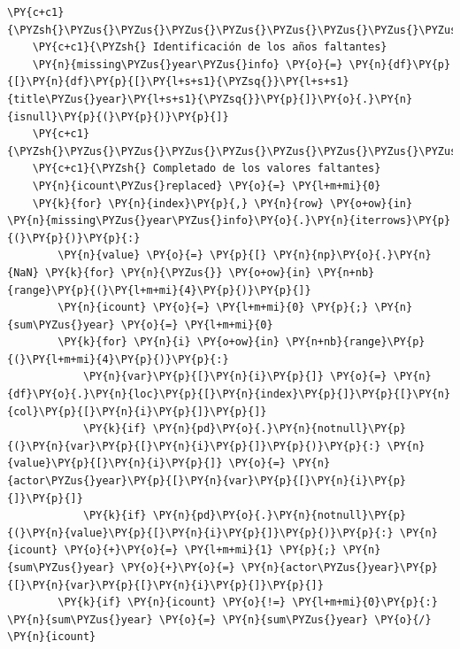 \begin{tcolorbox}[breakable, size=fbox, boxrule=1pt, pad at break*=1mm,colback=cellbackground, colframe=cellborder]
\begin{Verbatim}[commandchars=\\\{\}]
    \PY{c+c1}{\PYZsh{}\PYZus{}\PYZus{}\PYZus{}\PYZus{}\PYZus{}\PYZus{}\PYZus{}\PYZus{}\PYZus{}\PYZus{}\PYZus{}\PYZus{}\PYZus{}\PYZus{}\PYZus{}\PYZus{}\PYZus{}\PYZus{}\PYZus{}\PYZus{}\PYZus{}\PYZus{}\PYZus{}\PYZus{}\PYZus{}\PYZus{}\PYZus{}\PYZus{}\PYZus{}\PYZus{}\PYZus{}\PYZus{}\PYZus{}\PYZus{}\PYZus{}\PYZus{}\PYZus{}\PYZus{}}
    \PY{c+c1}{\PYZsh{} Identificación de los años faltantes}
    \PY{n}{missing\PYZus{}year\PYZus{}info} \PY{o}{=} \PY{n}{df}\PY{p}{[}\PY{n}{df}\PY{p}{[}\PY{l+s+s1}{\PYZsq{}}\PY{l+s+s1}{title\PYZus{}year}\PY{l+s+s1}{\PYZsq{}}\PY{p}{]}\PY{o}{.}\PY{n}{isnull}\PY{p}{(}\PY{p}{)}\PY{p}{]}
    \PY{c+c1}{\PYZsh{}\PYZus{}\PYZus{}\PYZus{}\PYZus{}\PYZus{}\PYZus{}\PYZus{}\PYZus{}\PYZus{}\PYZus{}\PYZus{}\PYZus{}\PYZus{}\PYZus{}\PYZus{}\PYZus{}\PYZus{}\PYZus{}\PYZus{}\PYZus{}\PYZus{}\PYZus{}\PYZus{}\PYZus{}\PYZus{}\PYZus{}\PYZus{}}
    \PY{c+c1}{\PYZsh{} Completado de los valores faltantes}
    \PY{n}{icount\PYZus{}replaced} \PY{o}{=} \PY{l+m+mi}{0}
    \PY{k}{for} \PY{n}{index}\PY{p}{,} \PY{n}{row} \PY{o+ow}{in} \PY{n}{missing\PYZus{}year\PYZus{}info}\PY{o}{.}\PY{n}{iterrows}\PY{p}{(}\PY{p}{)}\PY{p}{:}
        \PY{n}{value} \PY{o}{=} \PY{p}{[} \PY{n}{np}\PY{o}{.}\PY{n}{NaN} \PY{k}{for} \PY{n}{\PYZus{}} \PY{o+ow}{in} \PY{n+nb}{range}\PY{p}{(}\PY{l+m+mi}{4}\PY{p}{)}\PY{p}{]}
        \PY{n}{icount} \PY{o}{=} \PY{l+m+mi}{0} \PY{p}{;} \PY{n}{sum\PYZus{}year} \PY{o}{=} \PY{l+m+mi}{0}
        \PY{k}{for} \PY{n}{i} \PY{o+ow}{in} \PY{n+nb}{range}\PY{p}{(}\PY{l+m+mi}{4}\PY{p}{)}\PY{p}{:}            
            \PY{n}{var}\PY{p}{[}\PY{n}{i}\PY{p}{]} \PY{o}{=} \PY{n}{df}\PY{o}{.}\PY{n}{loc}\PY{p}{[}\PY{n}{index}\PY{p}{]}\PY{p}{[}\PY{n}{col}\PY{p}{[}\PY{n}{i}\PY{p}{]}\PY{p}{]}
            \PY{k}{if} \PY{n}{pd}\PY{o}{.}\PY{n}{notnull}\PY{p}{(}\PY{n}{var}\PY{p}{[}\PY{n}{i}\PY{p}{]}\PY{p}{)}\PY{p}{:} \PY{n}{value}\PY{p}{[}\PY{n}{i}\PY{p}{]} \PY{o}{=} \PY{n}{actor\PYZus{}year}\PY{p}{[}\PY{n}{var}\PY{p}{[}\PY{n}{i}\PY{p}{]}\PY{p}{]}
            \PY{k}{if} \PY{n}{pd}\PY{o}{.}\PY{n}{notnull}\PY{p}{(}\PY{n}{value}\PY{p}{[}\PY{n}{i}\PY{p}{]}\PY{p}{)}\PY{p}{:} \PY{n}{icount} \PY{o}{+}\PY{o}{=} \PY{l+m+mi}{1} \PY{p}{;} \PY{n}{sum\PYZus{}year} \PY{o}{+}\PY{o}{=} \PY{n}{actor\PYZus{}year}\PY{p}{[}\PY{n}{var}\PY{p}{[}\PY{n}{i}\PY{p}{]}\PY{p}{]}
        \PY{k}{if} \PY{n}{icount} \PY{o}{!=} \PY{l+m+mi}{0}\PY{p}{:} \PY{n}{sum\PYZus{}year} \PY{o}{=} \PY{n}{sum\PYZus{}year} \PY{o}{/} \PY{n}{icount} 


\end{Verbatim}
\end{tcolorbox}
